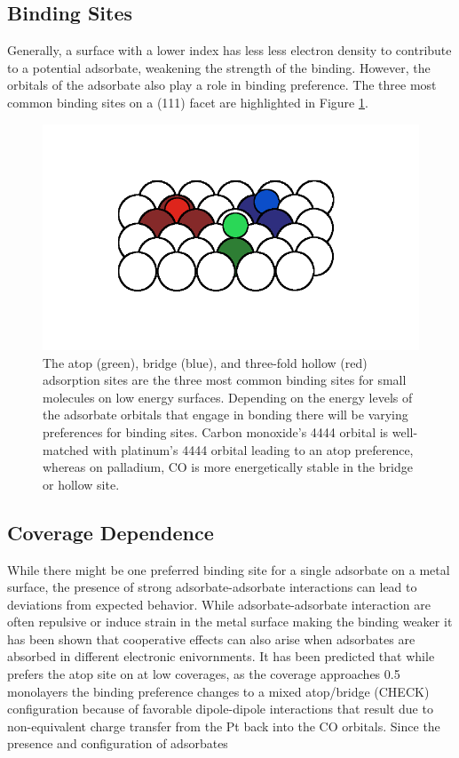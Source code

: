 \subsection{Binding Sites}
Generally, a surface with a lower index has less less electron density to
contribute to a potential adsorbate, weakening the strength of the binding.
However, the orbitals of the adsorbate also play a role in binding preference.
The three most common binding sites on a (111) facet are highlighted in Figure
\ref{fig:binding}.
\begin{figure}[p!]
  \includegraphics[width=\linewidth]{../figures/chap1/binding.pdf}
  \caption{The atop (green), bridge (blue), and three-fold hollow (red)
adsorption sites are the three most common binding sites for small molecules on
low energy surfaces. Depending on the energy levels of the adsorbate orbitals
that engage in bonding there will be varying preferences for binding sites.
Carbon monoxide's 4444 orbital is well-matched with platinum's 4444 orbital
leading to an atop preference, whereas on palladium, CO is more energetically
stable in the bridge or hollow site.}
\label{fig:binding}
\end{figure}


\subsection{Coverage Dependence}
While there might be one preferred binding site for a single adsorbate on a
metal surface, the presence of strong adsorbate-adsorbate interactions can lead
to deviations from expected behavior. While adsorbate-adsorbate interaction are
often repulsive or induce strain in the metal surface making the binding
weaker\citep{Deshlahra:2012aa} it has been shown that cooperative effects can also arise when
adsorbates are absorbed in different electronic enivornments. It has been
predicted that while  prefers the atop site on  at low coverages,
as the coverage approaches 0.5 monolayers the binding preference changes to a
mixed atop/bridge (CHECK) configuration because of favorable dipole-dipole
interactions that result due to non-equivalent charge transfer from the Pt back
into the CO orbitals. Since the presence and configuration of adsorbates 


